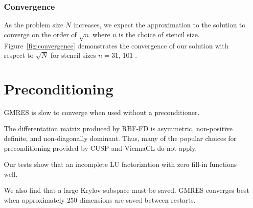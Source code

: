 \subsubsection{Convergence}

As the problem size $N$ increases, we expect the approximation to the solution to converge on the order of $\sqrt{n}$ where $n$ is the choice of stencil size. Figure~\ref{fig:convergence} demonstrates the convergence of our solution with respect to $\sqrt{N}$ for stencil sizes $n=31$, $101$ . 




\section{Preconditioning} 

GMRES is slow to converge when used without a preconditioner. 

The differentation matrix produced by RBF-FD is asymmetric, non-positive definite, and non-diagonally dominant. Thus, many of the popular choices for preconditioning provided by CUSP and ViennaCL do not apply. 

Our tests show that an incomplete LU factorization with zero fill-in \cite{Saad2003} functions well. 

We also find that a large Krylov subspace must be saved. GMRES converges best when approximately 250 dimensions are saved between restarts. 







